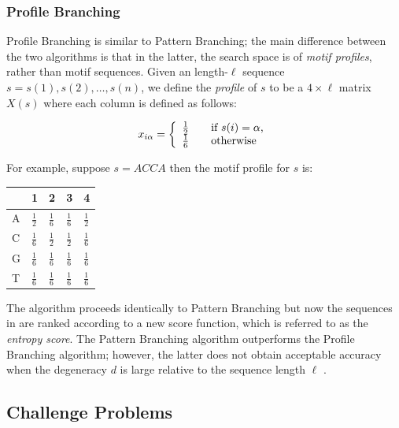  
\subsubsection{Profile Branching}

Profile Branching \cite{PRP} is similar to Pattern Branching; the main difference between the two algorithms is that in the latter, the search space is of {\em motif profiles}, rather than motif sequences. Given an length-$\ell$ sequence $s = s(1), s(2), \ldots, s(n)$, we define the {\em profile} of $s$ to be a $4 \times \ell$ matrix $X(s)$ where each column is defined as follows:


\[x_{i \alpha} = \left\{ 
\begin{array}{l l}
	\frac{1}{2} 	& \quad \mbox{if $s(i) = \alpha$,}\\
  	\frac{1}{6}		& \quad \mbox{otherwise}\\ \end{array} \right. \]

For example, suppose $s = ACCA$ then the motif profile for $s$ is:

\begin{center}
\begin{tabular}{ l | l l l l }
  ~ & 1 & 2 & 3 & 4 \\
  \hline
  A & $\frac{1}{2}$ & $\frac{1}{6}$ & $\frac{1}{6}$ & $\frac{1}{2}$ \\
  C & $\frac{1}{6}$ & $\frac{1}{2}$ & $\frac{1}{2}$ & $\frac{1}{6}$ \\
  G & $\frac{1}{6}$ & $\frac{1}{6}$ & $\frac{1}{6}$ & $\frac{1}{6}$ \\
  T & $\frac{1}{6}$ & $\frac{1}{6}$ & $\frac{1}{6}$ & $\frac{1}{6}$ \\  
\end{tabular}
\end{center}

The algorithm proceeds identically to Pattern Branching but now the sequences in are ranked according to a new score function, which is referred to as the {\em entropy score}.  The Pattern Branching algorithm outperforms the Profile Branching algorithm; however, the latter does not obtain acceptable accuracy when the degeneracy $d$ is large relative to the sequence length $\ell$ \cite{PRP}.   

\subsection{Challenge Problems} \label{challenge_problems_section}

